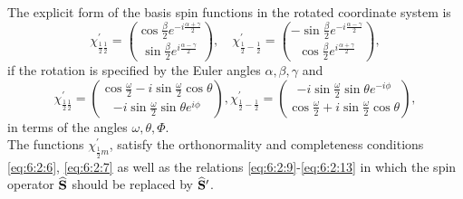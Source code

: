 The explicit form of the basis spin functions in the rotated coordinate system is
\begin{equation}
\chi_{\frac{1}{2} \frac{1}{2}}^{\prime}=\binom{\cos \frac{\beta}{2} e^{-i \frac{\alpha+\gamma}{2}}}{\sin \frac{\beta}{2} e^{i \frac{\alpha-\gamma}{2}}}, \quad \chi_{\frac{1}{2}-\frac{1}{2}}^{\prime}=\binom{-\sin \frac{\beta}{2} e^{-i \frac{\alpha-\gamma}{2}}}{\cos \frac{\beta}{2} e^{i \frac{\alpha+\gamma}{2}}}, \label{eq:6:2:17}
\end{equation}
if the rotation is specified by the Euler angles $\alpha, \beta, \gamma$ and
\begin{equation}
\chi_{\frac{1}{2} \frac{1}{2}}^{\prime}=\binom{\cos \frac{\omega}{2}-i \sin \frac{\omega}{2} \cos \theta}{-i \sin \frac{\omega}{2} \sin \theta e^{i \phi}}, \chi_{\frac{1}{2}-\frac{1}{2}}^{\prime}=\binom{-i \sin \frac{\omega}{2} \sin \theta e^{-i \phi}}{\cos \frac{\omega}{2}+i \sin \frac{\omega}{2} \cos \theta}, \label{eq:6:2:18}
\end{equation}
in terms of the angles $\omega, \theta, \Phi$.\\
The functions $\chi_{\frac{1}{2} m}^{\prime}$, satisfy the orthonormality and completeness conditions \eqref{eq:6:2:6}, \eqref{eq:6:2:7} as well as the relations \eqref{eq:6:2:9}-\eqref{eq:6:2:13} in which the spin operator $\widehat{\mathbf{S}}$ should be replaced by $\widehat{\mathbf{S}}^{\prime}$.

